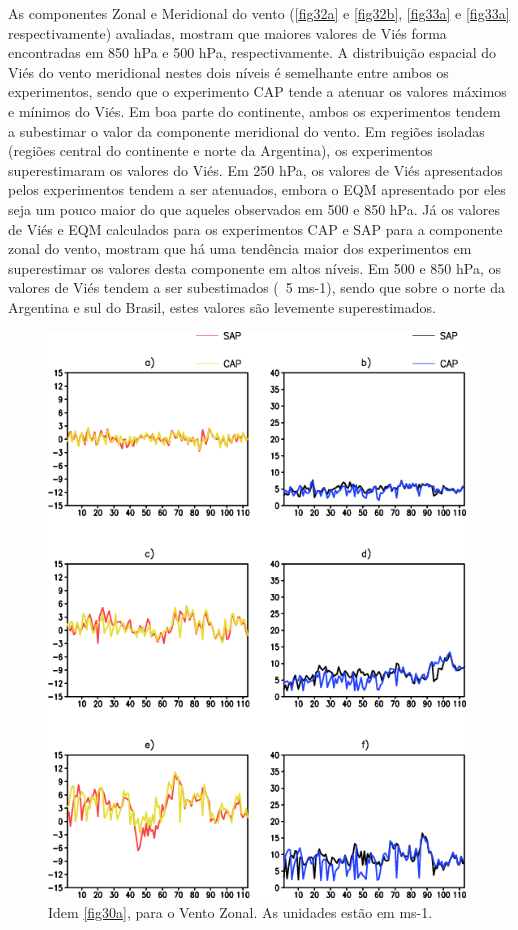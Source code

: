 As componentes Zonal e Meridional do vento (\autoref{fig32a} e \autoref{fig32b}, \autoref{fig33a} e \autoref{fig33a} respectivamente) avaliadas, mostram que maiores valores de Viés forma encontradas em 850 hPa e 500 hPa, respectivamente. A distribuição espacial do Viés do vento meridional nestes dois níveis é semelhante entre ambos os experimentos, sendo que o experimento CAP tende a atenuar os valores máximos e mínimos do Viés. Em boa parte do continente, ambos os experimentos tendem a subestimar o valor da componente meridional do vento. Em regiões isoladas (regiões central do continente e norte da Argentina), os experimentos superestimaram os valores do Viés. Em 250 hPa, os valores de Viés apresentados pelos experimentos tendem a ser atenuados, embora o EQM apresentado por eles seja um pouco maior do que aqueles observados em 500 e 850 hPa. Já os valores de Viés e EQM calculados para os experimentos CAP e SAP para a componente zonal do vento, mostram que há uma tendência maior dos experimentos em superestimar os valores desta componente em altos níveis. Em 500 e 850 hPa, os valores de Viés tendem a ser subestimados (~5 ms-1), sendo que sobre o norte da Argentina e sul do Brasil, estes valores são levemente superestimados.

\begin{figure}[!hbp]
\centering
\includegraphics[height=15cm]{./figs/vies_eqm-uvel.png}
\caption{Idem \autoref{fig30a}, para o Vento Zonal. As unidades estão em ms-1.}
\label{fig32a}
\end{figure}

